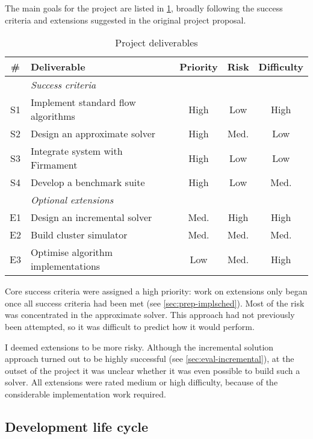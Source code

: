 
The main goals for the project are listed in \cref{table:prep-project-requirements}, broadly following the success criteria and extensions suggested in the original project proposal.

\begin{table}
    \centering
    \begin{tabular}{clccc}
        \textbf{\#} & \textbf{Deliverable} & \textbf{Priority} & \textbf{Risk} & \textbf{Difficulty}
        \tabularnewline
        \hline
        & \textit{Success criteria} \tabularnewline
        S1 & Implement standard flow algorithms & High & Low & High \tabularnewline
        S2 & Design an approximate solver & High & Med. & Low \tabularnewline
        S3 & Integrate system with Firmament & High & Low & Low \tabularnewline
        S4 & Develop a benchmark suite  & High & Low & Med. \tabularnewline
        \hline
        & \textit{Optional extensions} \tabularnewline
        E1 & Design an incremental solver & Med. & High & High \tabularnewline
        E2 & Build cluster simulator & Med. & Med. & Med. \tabularnewline
        E3 & Optimise algorithm implementations & Low & Med. & High \tabularnewline
        \hline
    \end{tabular}
    \caption{Project deliverables}
    \label{table:prep-project-requirements}
\end{table}

Core success criteria were assigned a high priority: work on extensions only began once all success criteria had been met (see \cref{sec:prep-implsched}). Most of the risk was concentrated in the approximate solver. This approach had not previously been attempted, so it was difficult to predict how it would perform.

I deemed extensions to be more risky. Although the incremental solution approach turned out to be highly successful (see \cref{sec:eval-incremental}), at the outset of the project it was unclear whether it was even possible to build such a solver. All extensions were rated medium or high difficulty, because of the considerable implementation work required.

\subsection{Development life cycle}
\label{sec:prep-management-model}

